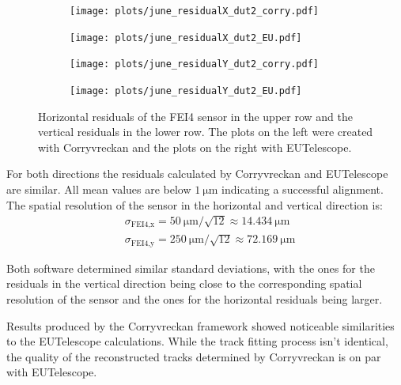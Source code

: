 \begin{figure}
  \hspace{-1cm}
  \begin{subfigure}{0.53\textwidth}
      \texttt{[image: plots/june\_residualX\_dut2\_corry.pdf]}
  \end{subfigure}
  \begin{subfigure}{0.53\textwidth}
      \texttt{[image: plots/june\_residualX\_dut2\_EU.pdf]}
  \end{subfigure}
  \begin{subfigure}{0.53\textwidth}
    \hspace{-1cm}
      \texttt{[image: plots/june\_residualY\_dut2\_corry.pdf]}
  \end{subfigure}
  \begin{subfigure}{0.53\textwidth}
    \hspace{-1cm}
      \texttt{[image: plots/june\_residualY\_dut2\_EU.pdf]}
  \end{subfigure}
  \caption{Horizontal residuals of the FEI4 sensor in the upper row and the vertical residuals in the lower row. The plots on the left
  were created with Corryvreckan and the plots on the right with EUTelescope.}
  \label{fig:residual_dut}
\end{figure}

For both directions the residuals calculated by Corryvreckan and EUTelescope are similar. All mean values are below $\SI{1}{\micro\meter}$
indicating a successful alignment. The spatial resolution of the sensor in the horizontal and vertical direction is:
\begin{align*}
  &\sigma_{\text{FEI4},\text{x}} = \SI{50}{\micro\meter}/\sqrt{12} \approx \SI{14.434}{\micro\meter} \\
  &\sigma_{\text{FEI4},\text{y}} = \SI{250}{\micro\meter}/\sqrt{12} \approx \SI{72.169}{\micro\meter}
\end{align*}

Both software determined similar standard deviations, with the ones for the residuals in the vertical direction being close to
the corresponding spatial resolution of the sensor and the ones for the horizontal residuals being larger.


Results produced by the Corryvreckan framework showed noticeable similarities to the EUTelescope calculations. While the track
fitting process isn't identical, the quality of the reconstructed tracks determined by Corryvreckan is on par with EUTelescope.
